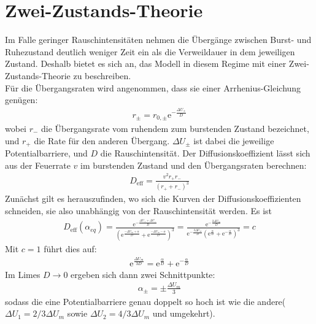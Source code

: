 \documentclass[12pt,a4paper]{article}
\begin{document}

\thispagestyle{empty}
\newpage
\tableofcontents
\thispagestyle{empty}
\newpage
{}
\section{Zwei-Zustands-Theorie}
Im Falle geringer Rauschintensitäten nehmen die Übergänge zwischen Burst- und Ruhezustand deutlich weniger Zeit ein als die Verweildauer in dem jeweiligen Zustand. Deshalb bietet es sich an, das Modell in diesem Regime mit einer Zwei-Zustands-Theorie zu beschreiben. \\
Für die Übergangsraten wird angenommen, dass sie einer Arrhenius-Gleichung genügen:
\begin{align*}
r_{\pm}=r_{0,\pm}\text{e}^{-\frac{\Delta U_{\pm}}{D}}
\end{align*}
wobei $r_-$ die Übergangsrate vom ruhendem zum burstenden Zustand bezeichnet, und $r_+$ die Rate für den anderen Übergang. $\Delta U_{\pm}$ ist dabei die jeweilige Potentialbarriere, und $D$ die Rauschintensität.  Der Diffusionskoeffizient lässt sich aus der Feuerrate $v$ im burstenden Zustand und den Übergangsraten berechnen:
\begin{align*}
D_{\text{eff}}=\frac{v^2 r_+r_-}{(r_++r_-)^3}
\end{align*}
Zunächst gilt es herauszufinden, wo sich die Kurven der Diffusionskoeffizienten schneiden, sie also unabhängig von der Rauschintensität werden. Es ist
\begin{align*}
D_{\text{eff}}(\alpha_{eq})=\frac{\text{e}^{-\frac{\Delta U_++\Delta U_-}{D}}}{\left(\text{e}^{\frac{-\Delta U_m+\alpha}{D}}+\text{e}^{\frac{-\Delta U_m-\alpha}{D}}\right)^3}=\frac{\text{e}^{-\frac{2\Delta U_m}{D}}}{\text{e}^{-\frac{3\Delta U_m}{D}}\left(\text{e}^{\frac{\alpha}{D}}+\text{e}^{-\frac{\alpha}{D}}\right)^3}=c
\end{align*}
Mit $c=1$ führt dies auf:
\begin{align*}
\text{e}^{\frac{\Delta U_m}{3D}}=\text{e}^\frac{\alpha}{D}+\text{e}^{-\frac{\alpha}{D}}
\end{align*}
Im Limes $D\rightarrow 0$ ergeben sich dann zwei Schnittpunkte:
\begin{align*}
\alpha_\pm=\pm\frac{\Delta U_m}{3}
\end{align*}
sodass die eine Potentialbarriere genau doppelt so hoch ist wie die andere($\Delta U_1=2/3\Delta U_m$ sowie $\Delta U_2=4/3\Delta U_m$ und umgekehrt).\\
\end{document}
